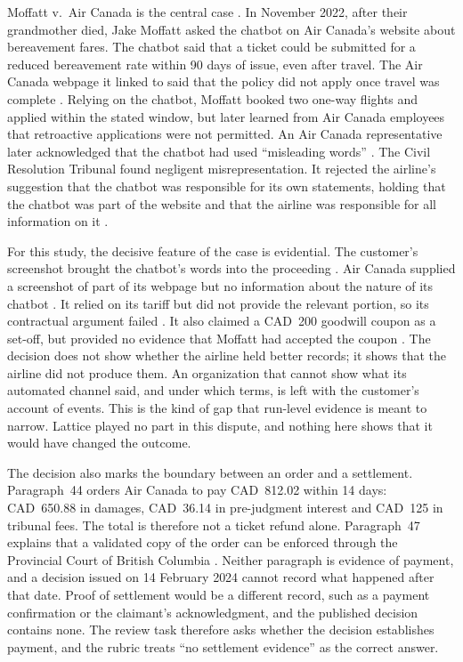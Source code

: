 \documentclass[11pt]{article}
\begin{document}
Moffatt v.\ Air Canada is the central case \citep{moffatt2024}. In November 2022, after their grandmother died, Jake Moffatt asked the chatbot on Air Canada's website about bereavement fares. The chatbot said that a ticket could be submitted for a reduced bereavement rate within 90 days of issue, even after travel. The Air Canada webpage it linked to said that the policy did not apply once travel was complete \citep[paras.~15--17]{moffatt2024}. Relying on the chatbot, Moffatt booked two one-way flights and applied within the stated window, but later learned from Air Canada employees that retroactive applications were not permitted. An Air Canada representative later acknowledged that the chatbot had used ``misleading words'' \citep[paras.~2, 18--22]{moffatt2024}. The Civil Resolution Tribunal found negligent misrepresentation. It rejected the airline's suggestion that the chatbot was responsible for its own statements, holding that the chatbot was part of the website and that the airline was responsible for all information on it \citep[paras.~27--32]{moffatt2024}.

For this study, the decisive feature of the case is evidential. The customer's screenshot brought the chatbot's words into the proceeding \citep[para.~15]{moffatt2024}. Air Canada supplied a screenshot of part of its webpage but no information about the nature of its chatbot \citep[paras.~14, 16]{moffatt2024}. It relied on its tariff but did not provide the relevant portion, so its contractual argument failed \citep[para.~31]{moffatt2024}. It also claimed a CAD~200 goodwill coupon as a set-off, but provided no evidence that Moffatt had accepted the coupon \citep[para.~41]{moffatt2024}. The decision does not show whether the airline held better records; it shows that the airline did not produce them. An organization that cannot show what its automated channel said, and under which terms, is left with the customer's account of events. This is the kind of gap that run-level evidence is meant to narrow. Lattice played no part in this dispute, and nothing here shows that it would have changed the outcome.

The decision also marks the boundary between an order and a settlement. Paragraph~44 orders Air Canada to pay CAD~812.02 within 14 days: CAD~650.88 in damages, CAD~36.14 in pre-judgment interest and CAD~125 in tribunal fees. The total is therefore not a ticket refund alone. Paragraph~47 explains that a validated copy of the order can be enforced through the Provincial Court of British Columbia \citep[paras.~44--47]{moffatt2024}. Neither paragraph is evidence of payment, and a decision issued on 14 February 2024 cannot record what happened after that date. Proof of settlement would be a different record, such as a payment confirmation or the claimant's acknowledgment, and the published decision contains none. The review task therefore asks whether the decision establishes payment, and the rubric treats ``no settlement evidence'' as the correct answer.
\end{document}
